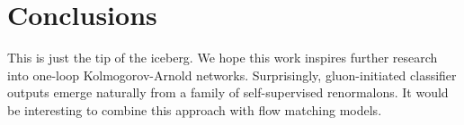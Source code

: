 \section{Conclusions}\label{sec:conclusions}

This is just the tip of the iceberg. We hope this work inspires further
research into one-loop Kolmogorov-Arnold networks. Surprisingly,
gluon-initiated classifier outputs emerge naturally from a family of
self-supervised renormalons. It would be interesting to combine this
approach with flow matching models.

